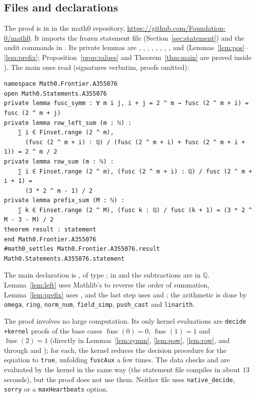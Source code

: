 \documentclass[11pt]{amsart}
\theoremstyle{plain}
\theoremstyle{definition}
\newcommand{\Q}{\mathbb{Q}}
\DeclareMathOperator{\fusc}{fusc}
\begin{document}
\subsection*{Files and declarations}
The proof is in  in the math0 repository, \url{https://github.com/Foundation-0/math0}. It imports the frozen statement file (Section~\ref{sec:statement}) and the audit commands in . Its private lemmas are , , , , , , , ,  and  (Lemmas~\ref{lem:pos}--\ref{lem:prefix}; Proposition~\ref{prop:values} and Theorem~\ref{thm:main} are proved inside ). The main ones read (signatures verbatim, proofs omitted):
\begin{lstlisting}
namespace Math0.Frontier.A355076
open Math0.Statements.A355076
private lemma fusc_symm : ∀ m i j, i + j = 2 ^ m → fusc (2 ^ m + i) = fusc (2 ^ m + j)
private lemma row_left_sum (m : ℕ) :
    ∑ i ∈ Finset.range (2 ^ m),
      (fusc (2 ^ m + i) : ℚ) / (fusc (2 ^ m + i) + fusc (2 ^ m + i + 1)) = 2 ^ m / 2
private lemma row_sum (m : ℕ) :
    ∑ i ∈ Finset.range (2 ^ m), (fusc (2 ^ m + i) : ℚ) / fusc (2 ^ m + i + 1) =
      (3 * 2 ^ m - 1) / 2
private lemma prefix_sum (M : ℕ) :
    ∑ k ∈ Finset.range (2 ^ M), (fusc k : ℚ) / fusc (k + 1) = (3 * 2 ^ M - 3 - M) / 2
theorem result : statement
end Math0.Frontier.A355076
#math0_settles Math0.Frontier.A355076.result Math0.Statements.A355076.statement
\end{lstlisting}
The main declaration is , of type ; in  and  the subtractions are in $\Q$. Lemma~\ref{lem:left} uses Mathlib's  to reverse the order of summation, Lemma~\ref{lem:prefix} uses , and the last step uses  and ; the arithmetic is done by \texttt{omega}, \texttt{ring}, \texttt{norm\_num}, \texttt{field\_simp}, \texttt{push\_cast} and \texttt{linarith}.

The proof involves no large computation. Its only kernel evaluations are \texttt{decide +kernel} proofs of the base cases $\fusc(0)=0$, $\fusc(1)=1$ and $\fusc(2)=1$ (directly in Lemmas~\ref{lem:symm}, \ref{lem:pow}, \ref{lem:row}, and through  and ); for each, the kernel reduces the decision procedure for the equation to \texttt{true}, unfolding \texttt{fuscAux} a few times. The data checks  and  are evaluated by the kernel in the same way (the statement file compiles in about $13$ seconds), but the proof does not use them. Neither file uses \texttt{native\_decide}, \texttt{sorry} or a \texttt{maxHeartbeats} option.
\end{document}
